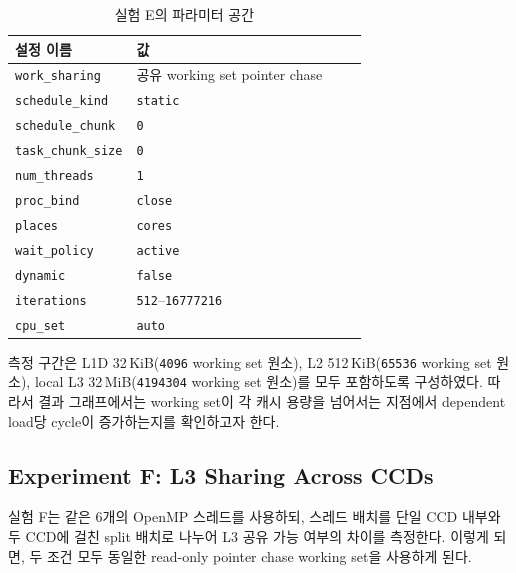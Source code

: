 \documentclass[11pt,a4paper]{article}
\begin{document}
\begin{table}[h]
\centering
\begin{tabular}{lp{0.70\linewidth}}
\toprule
설정 이름 & 값 \\
\midrule
\texttt{work\_sharing} & 공유 working set pointer chase \\
\texttt{schedule\_kind} & \texttt{static} \\
\texttt{schedule\_chunk} & \texttt{0} \\
\texttt{task\_chunk\_size} & \texttt{0} \\
\texttt{num\_threads} & \texttt{1} \\
\texttt{proc\_bind} & \texttt{close} \\
\texttt{places} & \texttt{cores} \\
\texttt{wait\_policy} & \texttt{active} \\
\texttt{dynamic} & \texttt{false} \\
\texttt{iterations} & \texttt{512}--\texttt{16777216} \\
\texttt{cpu\_set} & \texttt{auto} \\
\bottomrule
\end{tabular}
\caption{실험 E의 파라미터 공간}
\label{tab:expE-space}
\end{table}

측정 구간은 L1D 32\,KiB(\texttt{4096} working set 원소), L2 512\,KiB(\texttt{65536} working set 원소), local L3 32\,MiB(\texttt{4194304} working set 원소)를 모두 포함하도록 구성하였다. 따라서 결과 그래프에서는 working set이 각 캐시 용량을 넘어서는 지점에서 dependent load당 cycle이 증가하는지를 확인하고자 한다.

\subsection{Experiment F: L3 Sharing Across CCDs}

실험 F는 같은 6개의 OpenMP 스레드를 사용하되, 스레드 배치를 단일 CCD 내부와 두 CCD에 걸친 split 배치로 나누어 L3 공유 가능 여부의 차이를 측정한다. 이렇게 되면, 두 조건 모두 동일한 read-only pointer chase working set을 사용하게 된다.
\end{document}
